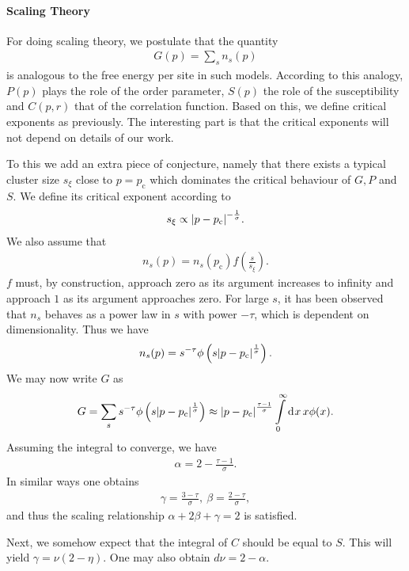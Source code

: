 \paragraph{Scaling Theory}
For doing scaling theory, we postulate that the quantity
\begin{align*}
	G(p) = \sum\limits_{s}n_{s}(p)
\end{align*}
is analogous to the free energy per site in such models. According to this analogy, $P(p)$ plays the role of the order parameter, $S(p)$ the role of the susceptibility and $C(p, r)$ that of the correlation function. Based on this, we define critical exponents as previously. The interesting part is that the critical exponents will not depend on details of our work.

To this we add an extra piece of conjecture, namely that there exists a typical cluster size $s_{\xi}$ close to $p = p_{\text{c}}$ which dominates the critical behaviour of $G, P$ and $S$. We define its critical exponent according to
\begin{align*}
	s_{\xi} \propto \abs{p - p_{\text{c}}}^{-\frac{1}{\sigma}}.
\end{align*}
We also assume that
\begin{align*}
	n_{s}(p) = n_{s}(p_{\text{c}})f\left(\frac{s}{s_{\xi}}\right).
\end{align*}
$f$ must, by construction, approach zero as its argument increases to infinity and approach $1$ as its argument approaches zero. For large $s$, it has been observed that $n_{s}$ behaves as a power law in $s$ with power $-\tau$, which is dependent on dimensionality. Thus we have
\begin{align*}
	n_{s}(p) = s^{-\tau}\phi\left(s\abs{p - p_{\text{c}}}^{\frac{1}{\sigma}}\right).
\end{align*}
We may now write $G$ as
\begin{align*}
	G = \sum\limits_{s}s^{-\tau}\phi\left(s\abs{p - p_{\text{c}}}^{\frac{1}{\sigma}}\right) \approx \abs{p - p_{\text{c}}}^{\frac{\tau - 1}{\sigma}}\int\limits_{0}^{\infty}\dd[]{x}x\phi(x).
\end{align*}
Assuming the integral to converge, we have
\begin{align*}
	\alpha = 2 - \frac{\tau - 1}{\sigma}.
\end{align*}
In similar ways one obtains
\begin{align*}
	\gamma = \frac{3 - \tau}{\sigma},\ \beta = \frac{2 - \tau}{\sigma},
\end{align*}
and thus the scaling relationship $\alpha + 2\beta + \gamma = 2$ is satisfied.

Next, we somehow expect that the integral of $C$ should be equal to $S$. This will yield $\gamma = \nu(2 - \eta)$. One may also obtain $d\nu = 2 - \alpha$.

